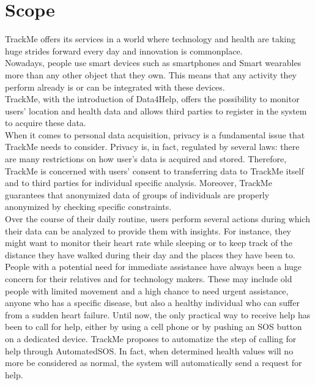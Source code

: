 \documentclass[../../rasd.tex]{subfiles}
\begin{document}
\section{Scope}
TrackMe offers its services in a world where technology and health are taking huge strides forward every day and innovation is commonplace.\\
Nowadays, people use smart devices such as smartphones and Smart wearables more than any other object that they own. This means that any activity they perform already is or can be integrated with these devices.\\
TrackMe, with the introduction of Data4Help, offers the possibility to monitor users’ location and health data and allows third parties to register in the system to acquire these data.\\

When it comes to personal data acquisition, privacy is a fundamental issue that TrackMe needs to consider. Privacy is, in fact, regulated by several laws: there are many restrictions on how user’s data is acquired and stored. Therefore, TrackMe is concerned with users’ consent to transferring data to TrackMe itself and to third parties for individual specific analysis. Moreover, TrackMe guarantees that anonymized data of groups of individuals are properly anonymized by checking specific constraints.\\

Over the course of their daily routine, users perform several actions during which their data can be analyzed to provide them with insights. For instance, they might want to monitor their heart rate while sleeping or to keep track of the distance they have walked during their day and the places they have been to.\\

People with a potential need for immediate assistance have always been a huge concern for their relatives and for technology makers. These may include old people with limited movement and a high chance to need urgent assistance, anyone who has a specific disease, but also a healthy individual who can suffer from a sudden heart failure. Until now, the only practical way to receive help has been to call for help, either by using a cell phone or by pushing an SOS button on a dedicated device. TrackMe proposes to automatize the step of calling for help through AutomatedSOS. In fact, when determined health values will no more be considered as normal, the system will automatically send a request for help.\\
\end{document}
